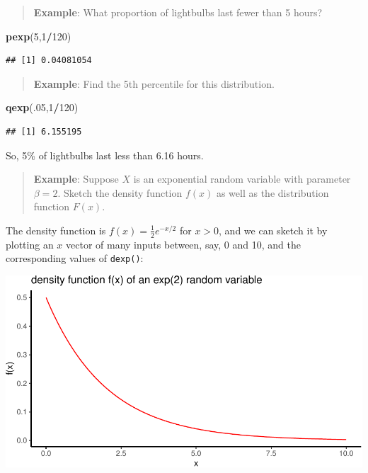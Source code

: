 \documentclass[
]{book}
\newenvironment{Shaded}{\begin{snugshade}}{\end{snugshade}}
\newcommand{\DecValTok}[1]{\textcolor[rgb]{0.00,0.00,0.81}{#1}}
\newcommand{\FunctionTok}[1]{\textcolor[rgb]{0.13,0.29,0.53}{\textbf{#1}}}
\newcommand{\NormalTok}[1]{#1}
\newcommand{\SpecialCharTok}[1]{\textcolor[rgb]{0.81,0.36,0.00}{\textbf{#1}}}
\theoremstyle{definition}
\theoremstyle{definition}
\theoremstyle{definition}
\theoremstyle{definition}
\theoremstyle{remark}
\begin{document}
\begin{quote}
\textbf{Example}: What proportion of lightbulbs last fewer than 5 hours?
\end{quote}

\begin{Shaded}
\begin{Highlighting}[]
\FunctionTok{pexp}\NormalTok{(}\DecValTok{5}\NormalTok{,}\DecValTok{1}\SpecialCharTok{/}\DecValTok{120}\NormalTok{)}
\end{Highlighting}
\end{Shaded}

\begin{verbatim}
## [1] 0.04081054
\end{verbatim}

\begin{quote}
\textbf{Example}: Find the 5th percentile for this distribution.
\end{quote}

\begin{Shaded}
\begin{Highlighting}[]
\FunctionTok{qexp}\NormalTok{(.}\DecValTok{05}\NormalTok{,}\DecValTok{1}\SpecialCharTok{/}\DecValTok{120}\NormalTok{)}
\end{Highlighting}
\end{Shaded}

\begin{verbatim}
## [1] 6.155195
\end{verbatim}

So, 5\% of lightbulbs last less than 6.16 hours.

\begin{quote}
\textbf{Example}: Suppose \(X\) is an exponential random variable with parameter \(\beta = 2\). Sketch the density function \(f(x)\) as well as the distribution function \(F(x)\).
\end{quote}

The density function is \(f(x) = \frac{1}{2}e^{-x/2}\) for \(x > 0\), and we can sketch it by plotting an \(x\) vector of many inputs between, say, 0 and 10, and the corresponding values of \texttt{dexp()}:

\begin{center}\includegraphics{math340-notes_files/figure-latex/unnamed-chunk-185-1} \end{center}
\end{document}
